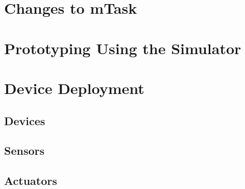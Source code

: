 
\section{Changes to mTask}

\section{Prototyping Using the Simulator}

\section{Device Deployment}
\subsection{Devices}
\subsection{Sensors}
\subsection{Actuators}

